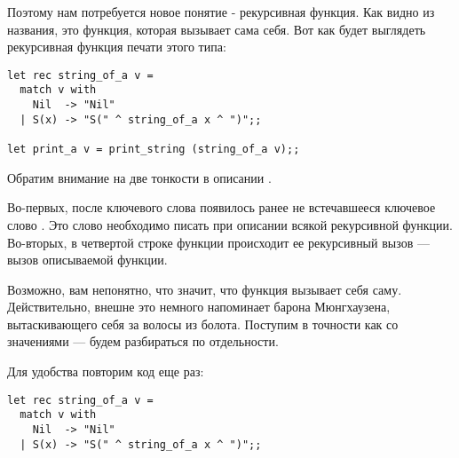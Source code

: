 Поэтому нам потребуется новое понятие - рекурсивная функция. Как видно из
названия, это функция, которая вызывает сама себя. Вот как будет выглядеть
рекурсивная функция печати этого типа:

\begin{verbatim}
let rec string_of_a v =
  match v with
    Nil  -> "Nil"
  | S(x) -> "S(" ^ string_of_a x ^ ")";;

let print_a v = print_string (string_of_a v);;
\end{verbatim}

Обратим внимание на две тонкости в описании . 

Во-первых, после ключевого слова  появилось ранее не встечавшееся ключевое 
слово . Это слово необходимо писать при описании всякой рекурсивной функции. 
Во-вторых, в четвертой строке функции  происходит ее 
рекурсивный вызов --- вызов описываемой функции.

Возможно, вам непонятно, что значит, что функция вызывает себя саму. 
Действительно, внешне это немного напоминает барона Мюнгхаузена, 
вытаскивающего себя за волосы из болота. 
Поступим в точности как со значениями --- будем разбираться по отдельности.

Для удобства повторим код еще раз:

\begin{verbatim}
let rec string_of_a v =
  match v with
    Nil  -> "Nil"
  | S(x) -> "S(" ^ string_of_a x ^ ")";;
\end{verbatim}

